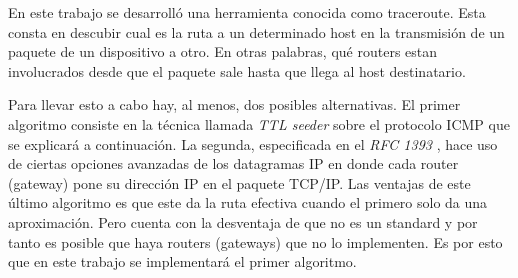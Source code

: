 En este trabajo se desarrolló una herramienta conocida como traceroute. Esta
consta en descubir cual es la ruta a un determinado host en la transmisión 
de un paquete de un dispositivo a otro. En otras palabras, qué routers estan
involucrados desde que el paquete sale hasta que llega al host destinatario.

Para llevar esto a cabo hay, al menos, dos posibles alternativas. El primer
algoritmo consiste en la técnica llamada \emph{TTL seeder} sobre el protocolo
ICMP que se explicará a continuación. La segunda, especificada en el \emph{RFC
1393} \cite{rfc1393}, hace uso de ciertas opciones avanzadas de los datagramas IP en donde
cada router (gateway) pone su dirección IP en el paquete TCP/IP. Las ventajas
de este último algoritmo es que este da la ruta efectiva
cuando el primero solo da una aproximación. Pero cuenta con la desventaja de que no es un standard
y por tanto es posible que haya routers (gateways) que no lo
implementen. Es por esto que en este trabajo se implementará el primer
algoritmo.
